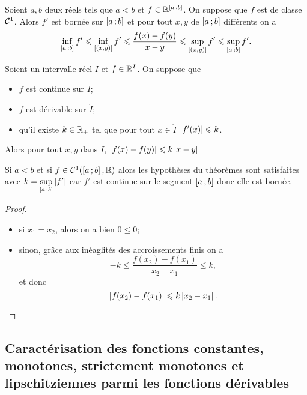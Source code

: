 \begin{prop}
  Soient \(a, b\) deux réels tels que \(a < b\) et \(f \in \mathbb{R}^{\left[ a \, ;  b \right]}\). On suppose que \(f\) est de classe \(\mathcal{C}^{1}\). Alors \(f'\) est bornée sur \(\left[ a \, ;  b \right]\) et pour tout \(x,y\) de \(\left[ a \, ;  b \right]\) différents on a
  \begin{equation}
    \inf\limits_{\left[ a \, ;  b \right]}f' \leqslant \inf\limits_{[(x,y)]}f' \leqslant \frac{f(x)-f(y)}{x-y} \leqslant \sup\limits_{[(x,y)]}f' \leqslant \sup\limits_{\left[ a \, ;  b \right]}f'.
  \end{equation}
\end{prop}
\begin{theo}
  Soient un intervalle réel \(I\) et \(f \in \mathbb{R}^I\). On suppose que
  \begin{itemize}
  \item \(f\) est continue sur \(I\);
  \item \(f\) est dérivable sur \(\mathring{I}\);
  \item qu'il existe \(k \in \mathbb{R}_{+}\) tel que pour tout \(x \in \mathring{I}\) \(\left\lvert f'(x)\right\rvert \leqslant k\).
  \end{itemize}
  Alors pour tout \(x,y\) dans \(I\), \(\left\lvert f(x)-f(y)\right\rvert \leqslant k\left\lvert x-y\right\rvert\)
\end{theo}

Si \(a < b\) et si \(f \in \mathcal{C}^{1}(\left[ a \, ;  b \right], \mathbb{R})\) alors les hypothèses du théorèmes sont satisfaites avec \(k=\sup\limits_{\left[ a \, ;  b \right]}\left\lvert f'\right\rvert\) car \(f'\) est continue sur le segment \(\left[ a \, ;  b \right]\) donc elle est bornée.

\begin{proof}
  \begin{itemize}
  \item si \(x_1=x_2\), alors on a bien \(0 \leqslant 0\);
  \item sinon, grâce aux inéaglités des accroissements finis on a
    \begin{equation}
      -k \leqslant \frac{f(x_2)-f(x_1)}{x_2-x_1} \leqslant k,
    \end{equation}
    et donc
    \begin{equation}
       \left\lvert f(x_2)-f(x_1)\right\rvert \leqslant k\left\lvert x_2-x_1\right\rvert.
    \end{equation}
  \end{itemize}
\end{proof}

\subsection{Caractérisation des fonctions constantes, monotones, strictement monotones et lipschitziennes parmi les fonctions dérivables}


